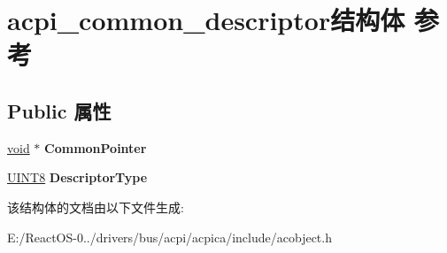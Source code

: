 \hypertarget{structacpi__common__descriptor}{}\section{acpi\+\_\+common\+\_\+descriptor结构体 参考}
\label{structacpi__common__descriptor}
\subsection*{Public 属性}
\begin{DoxyCompactItemize}
\item 
\mbox{\label{structacpi__common__descriptor_a02ca2215909e9b5a8d30344521c4e8fc}} 
\hyperlink{interfacevoid}{void} $\ast$ {\bfseries Common\+Pointer}
\item 
\mbox{\label{structacpi__common__descriptor_a74f1ea034fbb1221897c9d977901a4c1}} 
\hyperlink{_processor_bind_8h_ab27e9918b538ce9d8ca692479b375b6a}{U\+I\+N\+T8} {\bfseries Descriptor\+Type}
\end{DoxyCompactItemize}


该结构体的文档由以下文件生成\+:\begin{DoxyCompactItemize}
\item 
E\+:/\+React\+O\+S-\/0../drivers/bus/acpi/acpica/include/acobject.\+h\end{DoxyCompactItemize}
